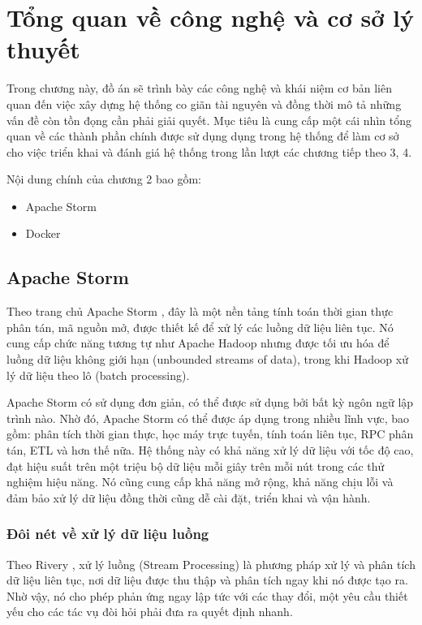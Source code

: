 \chapter{Tổng quan về công nghệ và cơ sở lý thuyết}

Trong chương này, đồ án sẽ trình bày các công nghệ và khái niệm cơ bản liên quan đến việc xây dựng hệ thống co giãn tài nguyên và đồng thời mô tả những vấn đề còn tồn đọng cần phải giải quyết. Mục tiêu là cung cấp một cái nhìn tổng quan về các thành phần chính được sử dụng dụng trong hệ thống để làm cơ sở cho việc triển khai và đánh giá hệ thống trong lần lượt các chương tiếp theo 3, 4.

Nội dung chính của chương 2 bao gồm:
\begin{itemize}
    \item Apache Storm
    \item Docker
\end{itemize}

\section{Apache Storm}

Theo trang chủ Apache Storm \autocite{apachestorm}, đây là một nền tảng tính toán thời gian thực phân tán, mã nguồn mở, được thiết kế để xử lý các luồng dữ liệu liên tục. Nó cung cấp chức năng tương tự như Apache Hadoop nhưng được tối ưu hóa để luồng dữ liệu không giới hạn (unbounded streams of data), trong khi Hadoop xử lý dữ liệu theo lô (batch processing).

Apache Storm có sử dụng đơn giản, có thể được sử dụng bởi bất kỳ ngôn ngữ lập trình nào. Nhờ đó, Apache Storm có thể được áp dụng trong nhiều lĩnh vực, bao gồm: phân tích thời gian thực, học máy trực tuyến, tính toán liên tục, RPC phân tán, ETL và hơn thế nữa. Hệ thống này có khả năng xử lý dữ liệu với tốc độ cao, đạt hiệu suất trên một triệu bộ dữ liệu mỗi giây trên mỗi nút trong các thử nghiệm hiệu năng. Nó cũng cung cấp khả năng mở rộng, khả năng chịu lỗi và đảm bảo xử lý dữ liệu đồng thời cũng dễ cài đặt, triển khai và vận hành.

\subsection{Đôi nét về xử lý dữ liệu luồng}

Theo Rivery \autocite{rivery_batch_vs_stream}, xử lý luồng (Stream Processing) là phương pháp xử lý và phân tích dữ liệu liên tục, nơi dữ liệu được thu thập và phân tích ngay khi nó được tạo ra. Nhờ vậy, nó cho phép phản ứng ngay lập tức với các thay đổi, một yêu cầu thiết yếu cho các tác vụ đòi hỏi phải đưa ra quyết định nhanh.

